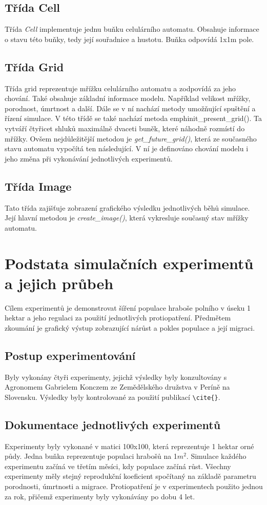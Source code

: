 \documentclass[a4paper,11pt]{article}
\begin{document}
\subsection{Třída Cell}
Třída \emph{Cell} implementuje jednu buňku celulárního automatu. Obsahuje informace o stavu této buňky, tedy její souřadnice a hustotu. Buňka odpovídá 1x1m pole.

\subsection{Třída Grid}
Třída grid reprezentuje mřížku celulárního automatu a zodpovídá za jeho chování. Také obsahuje základní informace modelu. Například velikost mřížky, porodnost, úmrtnost a další. Dále se v ní nachází metody umožňující spuštění a řízení simulace. V této třídě se také nachází metoda emph{init\_present\_grid()}. Ta vytváří čtyřicet shluků maximálně dvaceti buněk, které náhodně rozmístí do mřížky.
Ovšem nejdůležitější metodou je \emph{get\_future\_grid()}, která ze současného stavu automatu vypočítá ten následující. V ní je definováno chování modelu i jeho změna při vykonávání jednotlivých experimentů.

\subsection{Třída Image}
Tato třída zajišťuje zobrazení grafického výsledku jednotlivých běhů simulace. Její hlavní metodou je \emph{create\_image()}, která vykresluje současný stav mřížky automatu.


\section{Podstata simulačních experimentů a jejich průbeh}
Cílem experimentů je demonstrovat šíření populace hraboše polního v úseku 1 hektar a jeho regulaci za použití jednotlivých protiopatření. Předmětem zkoumání je grafický výstup zobrazující nárůst a pokles populace a její migraci. 
\subsection{Postup experimentování}
Byly vykonány čtyři experimenty, jejichž výsledky byly konzultovány s Agronomem Gabrielem Konczem ze Zemědělského družstva v Períně na Slovensku. Výsledky byly kontrolované za použití publikací \cite{eagri_data} \cite{Winter_temp} \verb|\cite{}|.
\subsection{Dokumentace jednotlivých experimentů}
Experimenty byly vykonané v matici 100x100, která reprezentuje 1 hektar orné půdy. Jedna buňka reprezentuje populaci hrabošů na 1$m^{2}$. Simulace každého experimentu začíná ve třetím měsíci, kdy populace začíná růst. Všechny experimenty měly stejný reprodukční koeficient spočítaný na základě parametru porodnosti, úmrtnosti a migrace. Protiopatření je v experimentech použito jednou za rok, přičemž experimenty byly vykonávány po dobu 4 let.
\end{document}
